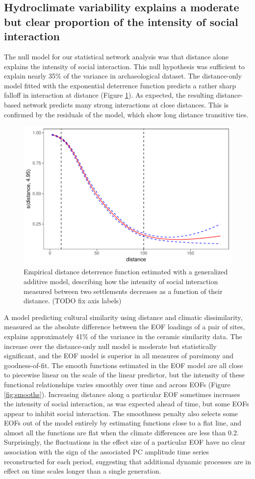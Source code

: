 \documentclass[11pt]{iopart}
\begin{document}
\subsection*{Hydroclimate variability explains a moderate but clear proportion of the intensity of social interaction}
The null model for our statistical network analysis was that distance alone explains the intensity of social interaction. This null hypothesis was sufficient to explain nearly 35\% of the variance in archaeological dataset. The distance-only model fitted with the exponential deterrence function predicts a rather sharp falloff in interaction at distance (Figure \ref{fig:distance}). As expected, the resulting distance-based network predicts many strong interactions at close distances. This is confirmed by the residuals of the model, which show long distance transitive ties.

\begin{figure}[!htbp]
\centering
\includegraphics[width=.6\linewidth]{figures/distance_function.pdf}
\caption{Empirical distance deterrence function estimated with a generalized additive model, describing how the intensity of social interaction measured between two settlements decreases as a function of their distance.  (TODO fix axis labels)}
\label{fig:distance}
\end{figure}

A model predicting cultural similarity using distance and climatic dissimilarity, measured as the absolute difference between the EOF loadings of a pair of sites, explains approximately 41\% of the variance in the ceramic similarity data. The increase over the distance-only null model is moderate but statistically significant, and the EOF model is superior in all measures of parsimony and goodness-of-fit. The smooth functions estimated in the EOF model are all close to piecewise linear on the scale of the linear predictor, but the intensity of these functional relationships varies smoothly over time and across EOFs (Figure \ref{fig:smooths}). Increasing distance along a particular EOF sometimes increases the intensity of social interaction, as was expected ahead of time, but some EOFs appear to inhibit social interaction. The smoothness penalty also selects some EOFs out of the model entirely by estimating functions close to a flat line, and almost all the functions are flat when the climate differences are less than 0.2. Surprisingly, the fluctuations in the effect size of a particular EOF have no clear association with the sign of the associated PC amplitude time series reconstructed for each period, suggesting that additional dynamic processes are in effect on time scales longer than a single generation. 
\end{document}

